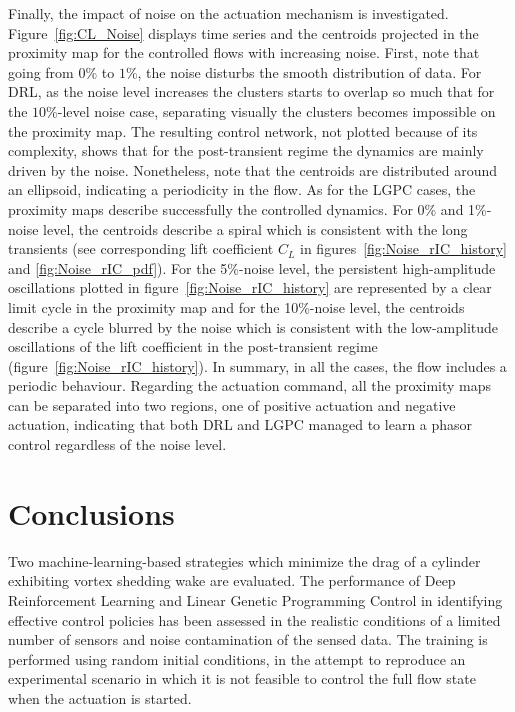 Finally, the impact of noise on the actuation mechanism is investigated. Figure~\ref{fig:CL_Noise} displays time series and the centroids projected in the proximity map for the controlled flows with increasing noise. First, note that going from $0\%$ to $1\%$, the noise disturbs the smooth distribution of data. For DRL, as the noise level increases the clusters starts to overlap so much that for the $10\%$-level noise case, separating visually the clusters becomes impossible on the proximity map. The resulting control network, not plotted because of its complexity, shows that for the post-transient regime the dynamics are mainly driven by the noise. Nonetheless, note that the centroids are distributed around an ellipsoid, indicating a periodicity in the flow. As for the LGPC cases, the proximity maps describe successfully the controlled dynamics. For 0\% and 1\%-noise level, the centroids describe a spiral which is consistent with the long transients (see corresponding lift coefficient $C_L$ in figures~\ref{fig:Noise_rIC_history} and \ref{fig:Noise_rIC_pdf}). For the 5\%-noise level, the persistent high-amplitude oscillations plotted in figure~\ref{fig:Noise_rIC_history} are represented by a clear limit cycle in the proximity map and for the 10\%-noise level, the centroids describe a cycle blurred by the noise which is consistent with the low-amplitude oscillations of the lift coefficient in the post-transient regime (figure~\ref{fig:Noise_rIC_history}). In summary, in all the cases, the flow includes a periodic behaviour. Regarding the actuation command, all the proximity maps can be separated into two regions, one of positive actuation and negative actuation, indicating that both DRL and LGPC managed to learn a phasor control regardless of the noise level.

\section{Conclusions}\label{s:Conclusions}

Two machine-learning-based strategies which minimize the drag of a cylinder exhibiting vortex shedding wake are evaluated. The performance of Deep Reinforcement Learning and Linear Genetic Programming Control in identifying effective control policies has been assessed in the realistic conditions of a limited number of sensors and noise contamination of the sensed data. The training is performed using random initial conditions, in the attempt to reproduce an experimental scenario in which it is not feasible to control the full flow state when the actuation is started.

